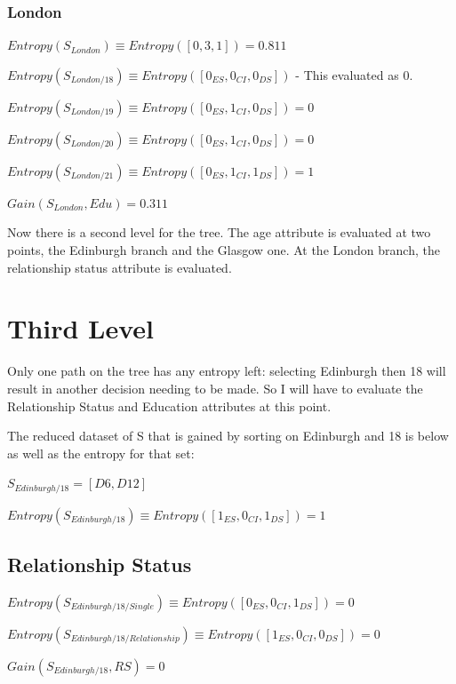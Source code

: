 \documentclass[8pt]{article}
\begin{document}
      \subsubsection{London}

        $Entropy(S_{London}) \equiv Entropy([0,3,1])=0.811$

        \begin{description}
          \setlength{\itemsep}{1pt}
          \setlength{\parskip}{0pt}
          \setlength{\parsep}{0pt}
          \item[]$Entropy(S_{London/18})\equiv Entropy([0_{ES},0_{CI},0_{DS}])$ - This evaluated as 0.
          \item[]$Entropy(S_{London/19})\equiv Entropy([0_{ES},1_{CI},0_{DS}]) = 0$
          \item[]$Entropy(S_{London/20})\equiv Entropy([0_{ES},1_{CI},0_{DS}]) = 0$ 
          \item[]$Entropy(S_{London/21})\equiv Entropy([0_{ES},1_{CI},1_{DS}]) = 1$ 
          \item[]$Gain(S_{London},Edu)= 0.311$
        \end{description}

        Now there is a second level for the tree. The age attribute is evaluated at two points, the Edinburgh branch
        and the Glasgow one. At the London branch, the relationship status attribute is evaluated.

  \section{Third Level}
    Only one path on the tree has any entropy left: selecting Edinburgh then 18 will result in another decision
    needing to be made. So I will have to evaluate the Relationship Status and Education attributes at this point.

    The reduced dataset of S that is gained by sorting on Edinburgh and 18 is below as well as the entropy for that set:
    \begin{description}
      \setlength{\itemsep}{1pt}
      \setlength{\parskip}{0pt}
      \setlength{\parsep}{0pt}
      \item [] $S_{Edinburgh/18} = [D6,D12]$
      \item [] $Entropy(S_{Edinburgh/18}) \equiv Entropy([1_{ES},0_{CI},1_{DS}]) = 1$
    \end{description}     

    \subsection{Relationship Status}
      \begin{description}
        \setlength{\itemsep}{1pt}
        \setlength{\parskip}{0pt}
        \setlength{\parsep}{0pt}
        \item[]$Entropy(S_{Edinburgh/18/Single})\equiv Entropy([0_{ES},0_{CI},1_{DS}]) = 0$
        \item[]$Entropy(S_{Edinburgh/18/Relationship})\equiv Entropy([1_{ES},0_{CI},0_{DS}]) = 0$
        \item[]$Gain(S_{Edinburgh/18},RS)= 0$
      \end{description}
\end{document}
